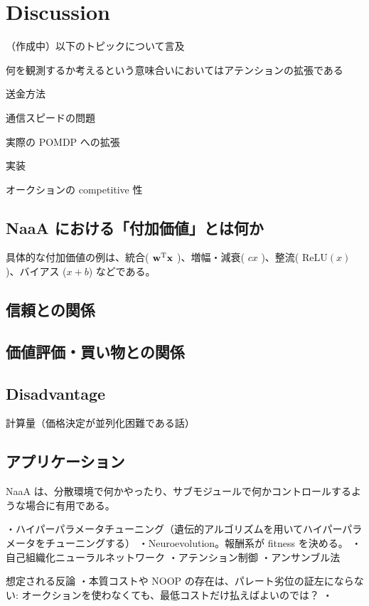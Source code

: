 \section{Discussion}
（作成中）以下のトピックについて言及

何を観測するか考えるという意味合いにおいてはアテンションの拡張である

送金方法

通信スピードの問題

実際の POMDP への拡張

実装

オークションの competitive 性

\subsection{NaaA における「付加価値」とは何か}
具体的な付加価値の例は、統合( $\mathrm{\mathbf{w}}^{\mathrm{T}} \mathrm{\mathbf{x}}$ )、増幅・減衰( $cx$ )、整流( $\mathrm{ReLU}(x)$ )、バイアス ($x+b$) などである。

\subsection{信頼との関係}
\subsection{価値評価・買い物との関係}

\subsection{Disadvantage}
計算量（価格決定が並列化困難である話）

\subsection{アプリケーション}
NaaA は、分散環境で何かやったり、サブモジュールで何かコントロールするような場合に有用である。

・ハイパーパラメータチューニング（遺伝的アルゴリズムを用いてハイパーパラメータをチューニングする）
	・Neuroevolution。報酬系が fitness を決める。
・自己組織化ニューラルネットワーク
・アテンション制御
・アンサンブル法
\fi


想定される反論
・本質コストや NOOP の存在は、パレート劣位の証左にならない: オークションを使わなくても、最低コストだけ払えばよいのでは？
・
\fi

